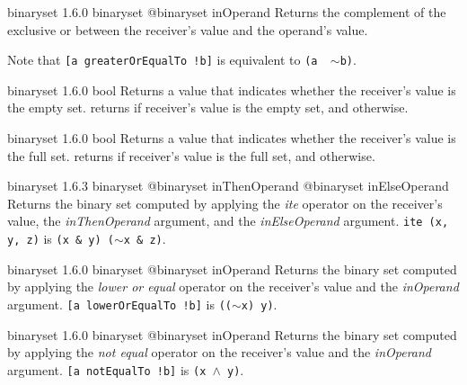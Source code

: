 {binaryset}
{1.6.0}
{binaryset}
{@binaryset inOperand}
{Returns the complement of the exclusive or between the receiver's value and the operand's value.}
{}

Note that \texttt{[a greaterOrEqualTo !b]} is equivalent to \texttt{(a \textbar ~$\sim$b)}.








{binaryset}
{1.6.0}
{bool}
{Returns a  value that indicates whether the receiver's value is the empty set.}
{returns  if receiver's value is the empty set, and  otherwise.}







{binaryset}
{1.6.0}
{bool}
{Returns a  value that indicates whether the receiver's value is the full set.}
{returns  if receiver's value is the full set, and  otherwise.}







{binaryset}
{1.6.3}
{binaryset}
{@binaryset inThenOperand}
{@binaryset inElseOperand}
{Returns the binary set computed by applying the \emph{ite} operator on the receiver's value, the \emph{inThenOperand} argument, and the  \emph{inElseOperand} argument.}
{\texttt{ite (x, y, z)} is \texttt{(x \& y) \textbar ($\sim$x \& z)}.}







{binaryset}
{1.6.0}
{binaryset}
{@binaryset inOperand}
{Returns the binary set computed by applying the \emph{lower or equal} operator on the receiver's value and the \emph{inOperand} argument.}
{\texttt{[a lowerOrEqualTo !b]} is \texttt{(($\sim$x) \textbar y)}.}







{binaryset}
{1.6.0}
{binaryset}
{@binaryset inOperand}
{Returns the binary set computed by applying the \emph{not equal} operator on the receiver's value and the \emph{inOperand} argument.}
{\texttt{[a notEqualTo !b]} is \texttt{(x $\wedge$ y)}.}







